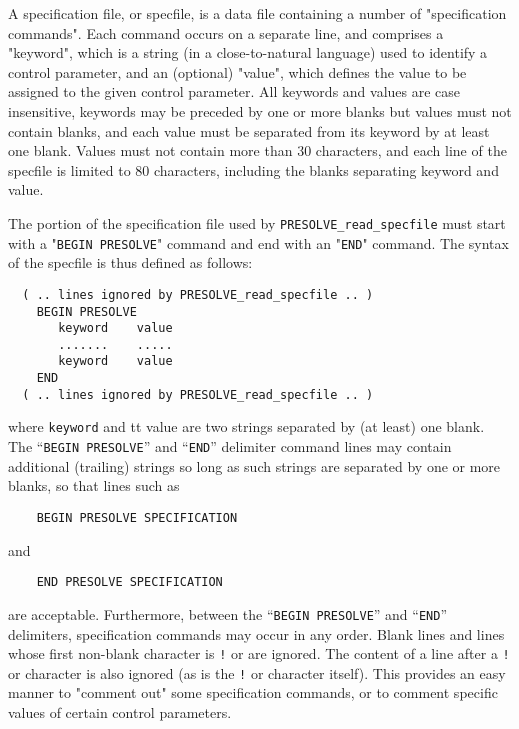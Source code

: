 \documentclass{galahad}
\newcommand{\packagename}{PRESOLVE}
\begin{document}
A specification file, or specfile, is a data file containing a number of 
"specification commands". Each command occurs on a separate line, 
and comprises a "keyword", 
which is a string (in a close-to-natural language) used to identify a 
control parameter, and 
an (optional) "value", which defines the value to be assigned to the given
control parameter. All keywords and values are case insensitive, 
keywords may be preceded by one or more blanks but
values must not contain blanks, and
each value must be separated from its keyword by at least one blank.
Values must not contain more than 30 characters, and 
each line of the specfile is limited to 80 characters,
including the blanks separating keyword and value.

The portion of the specification file used by {\tt \packagename\_read\_specfile}
must start with a "{\tt BEGIN \packagename}" command and end with an 
"{\tt END}" command.  The syntax of the specfile is thus defined as follows:
\begin{verbatim}
  ( .. lines ignored by PRESOLVE_read_specfile .. )
    BEGIN PRESOLVE
       keyword    value
       .......    .....
       keyword    value
    END 
  ( .. lines ignored by PRESOLVE_read_specfile .. )
\end{verbatim}
where {\tt keyword} and {tt value} are two strings separated by (at least) one
blank. The ``{\tt BEGIN \packagename}'' and ``{\tt END}'' delimiter command
lines  may contain additional (trailing) strings so long as such strings are 
separated by one or more blanks, so that lines such as
\begin{verbatim}
    BEGIN PRESOLVE SPECIFICATION
\end{verbatim}
and
\begin{verbatim}
    END PRESOLVE SPECIFICATION
\end{verbatim}
are acceptable. Furthermore, between the
``{\tt BEGIN \packagename}'' and ``{\tt END}'' delimiters,
specification commands may occur in any order.  Blank lines and
lines whose first non-blank character is {\tt !} or {\tt *} are ignored. 
The content of a line after a {\tt !} or {\tt *} character is also 
ignored (as is the {\tt !} or {\tt *}
character itself). This provides an easy manner to "comment out" some 
specification commands, or to comment specific values 
of certain control parameters.  
\end{document}
